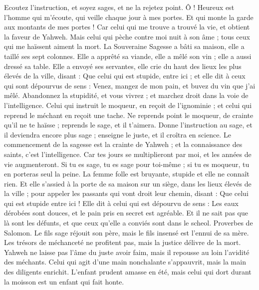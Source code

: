 \begin{multicols}{2}
Ecoutez l'instruction, et soyez sages, et ne la rejetez point.
Ô ! Heureux est l'homme qui m'écoute, qui veille chaque jour à mes portes. Et qui monte la garde aux montants de mes portes !
Car celui qui me trouve a trouvé la vie, et obtient la faveur de Yahweh.
Mais celui qui pèche contre moi nuit à son âme ; tous ceux qui me haïssent aiment la mort.
\VerseOne{}La Souveraine Sagesse a bâti sa maison, elle a taillé ses sept colonnes.
Elle a apprêté sa viande, elle a mêlé son vin ; elle a aussi dressé sa table.
Elle a envoyé ses servantes, elle crie du haut des lieux les plus élevés de la ville, disant : 
Que celui qui est stupide, entre ici ; et elle dit à ceux qui sont dépourvus de sens :
Venez, mangez de mon pain, et buvez du vin que j'ai mêlé.
Abandonnez la stupidité, et vous vivrez ; et marchez droit dans la voie de l'intelligence.
Celui qui instruit le moqueur, en reçoit de l'ignominie ; et celui qui reprend le méchant en reçoit une tache.
Ne reprends point le moqueur, de crainte qu'il ne te haïsse ; reprends le sage, et il t'aimera.
Donne l'instruction au sage, et il deviendra encore plus sage ; enseigne le juste, et il croîtra en science.
Le commencement de la sagesse est la crainte de Yahweh ; et la connaissance des saints, c'est l'intelligence.
Car tes jours se multiplieront par moi, et les années de vie augmenteront.
Si tu es sage, tu es sage pour toi-même ; si tu es moqueur, tu en porteras seul la peine.
La femme folle est bruyante, stupide et elle ne connaît rien.
Et elle s'assied à la porte de sa maison sur un siège, dans les lieux élevés de la ville ;
pour appeler les passants qui vont droit leur chemin, disant :
Que celui qui est stupide entre ici ! Elle dit à celui qui est dépourvu de sens :
Les eaux dérobées sont douces, et le pain pris en secret est agréable.
Et il ne sait pas que là sont les défunts, et que ceux qu'elle a conviés sont dans le scheol.
\VerseOne{}Proverbes de Salomon. Le fils sage réjouit son père, mais le fils insensé est l'ennui de sa mère.
Les trésors de méchanceté ne profitent pas, mais la justice délivre de la mort.
Yahweh ne laisse pas l'âme du juste avoir faim, mais il repousse au loin l'avidité des méchants.
Celui qui agit d'une main nonchalante s'appauvrit, mais la main des diligents enrichit.
L'enfant prudent amasse en été, mais celui qui dort durant la moisson est un enfant qui fait honte.

\end{multicols}
